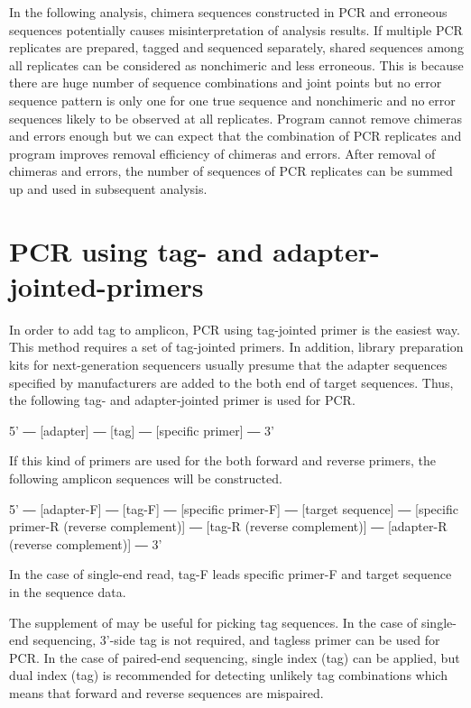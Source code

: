 \documentclass[titlepage,10pt,a4paper,english]{jsbook}
\newenvironment{pre}{\begin{leftbar}\raggedright\ttfamily\footnotesize\setlength{\baselineskip}{1.4em}}{\end{leftbar}\vspace{-1em}}
\begin{document}
In the following analysis, chimera sequences constructed in PCR and erroneous sequences potentially causes misinterpretation of analysis results.
If multiple PCR replicates are prepared, tagged and sequenced separately, shared sequences among all replicates can be considered as nonchimeric and less erroneous.
This is because there are huge number of sequence combinations and joint points but no error sequence pattern is only one for one true sequence and nonchimeric and no error sequences likely to be observed at all replicates.
Program cannot remove chimeras and errors enough but we can expect that the combination of PCR replicates and program improves removal efficiency of chimeras and errors.
After removal of chimeras and errors, the number of sequences of PCR replicates can be summed up and used in subsequent analysis.

\section{PCR using tag- and adapter-jointed-primers}

In order to add tag to amplicon, PCR using tag-jointed primer is the easiest way.
This method requires a set of tag-jointed primers.
In addition, library preparation kits for next-generation sequencers usually presume that the adapter sequences specified by manufacturers are added to the both end of target sequences.
Thus, the following tag- and adapter-jointed primer is used for PCR.

\begin{pre}
5' ― [adapter] ― [tag] ― [specific primer] ― 3'
\end{pre}

If this kind of primers are used for the both forward and reverse primers, the following amplicon sequences will be constructed.

\begin{pre}
5' ― [adapter-F] ― [tag-F] ― [specific primer-F] ― [target sequence] ― [specific primer-R (reverse complement)] ― [tag-R (reverse complement)] ― [adapter-R (reverse complement)] ― 3'
\end{pre}

In the case of single-end read, tag-F leads specific primer-F and target sequence in the sequence data.

The supplement of \citet{Hamady2008} may be useful for picking tag sequences.
In the case of single-end sequencing, 3'-side tag is not required, and tagless primer can be used for PCR.
In the case of paired-end sequencing, single index (tag) can be applied, but dual index (tag) is recommended for detecting unlikely tag combinations which means that forward and reverse sequences are mispaired.
\end{document}
